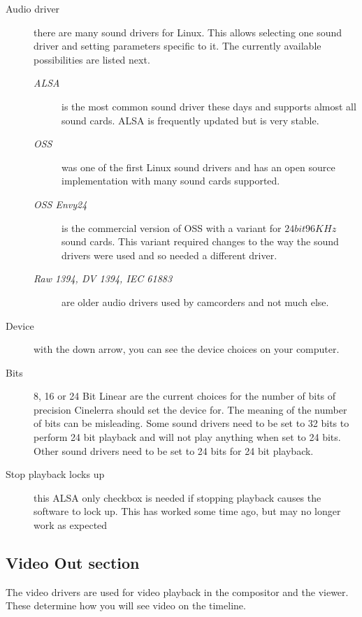 \begin{description}
    \item[Audio driver] there are many sound drivers for Linux. This allows selecting one sound driver and setting parameters specific to it. The currently available possibilities are listed next.
    \begin{description}
        \item[\textit{ALSA}] is the most common sound driver these days and supports almost all sound cards. ALSA
        is frequently updated but is very stable.
        \item[\textit{OSS}] was one of the first Linux sound drivers and has an open source implementation with many sound cards supported.
        \item[\textit{OSS Envy24}] is the commercial version of OSS with a variant for $24 bit 96 KHz$ sound cards. This variant required changes to the way the sound drivers were used and so needed a different driver.
        \item[\textit{Raw 1394, DV 1394, IEC 61883}] are older audio drivers used by camcorders and not much else.
    \end{description}
    \item[Device] with the down arrow, you can see the device choices on your computer.
    \item[Bits] 8, 16 or 24 Bit Linear are the current choices for the number of bits of precision Cinelerra should set the device for. The meaning of the number of bits can be misleading. Some sound drivers need to be set to 32 bits to perform 24 bit playback and will not play anything when set to 24 bits. Other sound drivers need to be set to 24 bits for 24 bit playback.
    \item[Stop playback locks up] this ALSA only checkbox is needed if stopping playback causes the software to lock up.  This has worked some time ago, but may no longer work as expected
\end{description}

\subsection{Video Out section}%
\label{sub:video_out_section}

The video drivers are used for video playback in the compositor and the viewer.  These determine how you will see video on the timeline.

